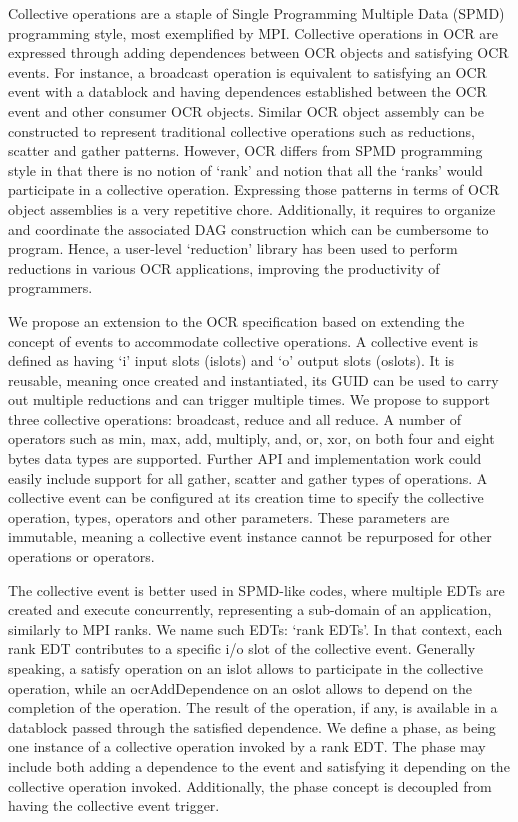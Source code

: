 Collective operations are a staple of Single Programming Multiple Data (SPMD)
programming style, most exemplified by MPI. Collective operations in OCR are
expressed through adding dependences between OCR objects and satisfying OCR events.
For instance, a broadcast operation is equivalent to satisfying an OCR event with a
datablock and having dependences established between the OCR event and other consumer
OCR objects. Similar OCR object assembly can be constructed to represent traditional
collective operations such as reductions, scatter and gather patterns. However, OCR differs
from SPMD programming style in that there is no notion of `rank' and notion that all the `ranks'
would participate in a collective operation.
Expressing those patterns in terms of OCR object assemblies is a very repetitive chore.
Additionally, it requires to organize and coordinate the associated DAG construction which
can be cumbersome to program. Hence, a user-level `reduction' library has been used to perform
reductions in various OCR applications, improving the productivity of programmers.

We propose an extension to the OCR specification based on extending the concept of events to
accommodate collective operations. A collective event is defined as having `i' input slots (islots)
and `o' output slots (oslots). It is reusable, meaning once created and instantiated, its GUID can be
used to carry out multiple reductions and can trigger multiple times. We propose to support three
collective operations: broadcast, reduce and all reduce. A number of operators such as min, max,
add, multiply, and, or, xor, on both four and eight bytes data types are supported. Further API and
implementation work could easily include support for all gather, scatter and gather types
of operations.
A collective event can be configured at its creation time to specify the collective
operation, types, operators and other parameters. These parameters are immutable,
meaning a collective event instance cannot be repurposed for other operations or operators.

The collective event is better used in SPMD-like codes, where multiple EDTs
are created and execute concurrently, representing a sub-domain of an application,
similarly to MPI ranks. We name such EDTs: `rank EDTs'. In that context, each rank
EDT contributes to a specific i/o slot of the collective event. Generally speaking,
a satisfy operation on an islot allows to participate in the collective operation,
while an ocrAddDependence on an oslot allows to depend on the completion of the
operation. The result of the operation, if any, is available in a datablock
passed through the satisfied dependence.
We define a phase, as being one instance of a collective operation invoked by
a rank EDT. The phase may include both adding a dependence to the event
and satisfying it depending on the collective operation invoked.
Additionally, the phase concept is decoupled from having the collective event trigger.

